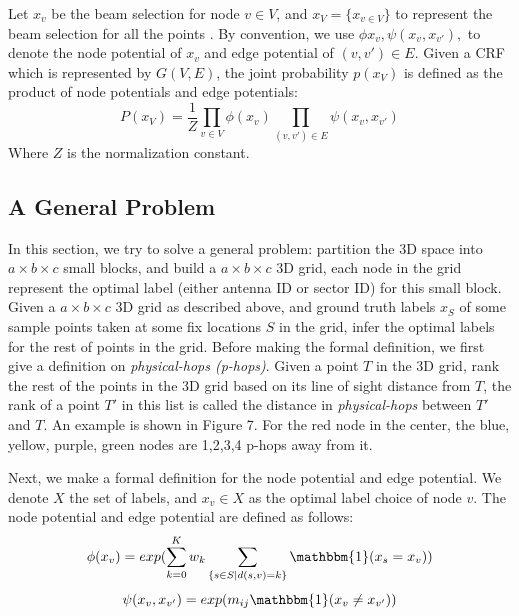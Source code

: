 \documentclass[conference]{IEEEtran}
\begin{document}
Let $x_{v}$ be the beam selection for node $v\in V$, and $x_{V}=\{x_{v\in V}\}$ to represent the beam selection for all the points . By convention, we use $\phi{x_{v}},\psi(x_{v},x_{v'}),$ to denote the node potential of $x_{v}$ and edge potential of $(v,v')\in E$. Given a CRF which is represented by $G(V,E)$, the joint probability $p(x_{V})$ is defined as the product of node potentials and edge potentials:
\begin{equation}
P(x_V)=\frac{1}{Z}\prod_{v\in V} \phi(x_{v})\prod_{(v,v')\in E} \psi(x_{v},x_{v'})
\end{equation} 
Where $Z$ is the normalization constant. 
\subsection{A General Problem}
In this section, we try to solve a general problem: partition the 3D space into $a\times b\times c$ small blocks, and build a $a\times b\times c$ 3D grid, each node in the grid represent the optimal label (either antenna ID or sector ID) for this small block. Given a $a\times b\times c$ 3D grid as described above, and ground truth labels $x_{S}$ of some sample points taken at some fix locations $S$ in the grid, infer the optimal labels for the rest of points in the grid.
Before making the formal definition, we first give a definition on \emph{physical-hops (p-hops)}. Given a point $T$ in the 3D grid, rank the rest of the points in the 3D grid based on its line of sight distance from $T$, the rank of a point $T'$ in this list is called the distance in \emph{physical-hops} between $T'$ and $T$. An example is shown in Figure 7. For the red node in the center, the blue, yellow, purple, green nodes are 1,2,3,4 p-hops away from it. 

Next, we make a formal definition for the node potential and edge potential. We denote $X$ the set of labels, and $x_{v} \in X$ as the optimal label choice of node $v$. The node potential and edge potential are defined as follows:
\begin{equation}
\phi(x_{v})=exp(\sum_{k=0}^{K} w_{k} \sum_{\{s\in S| d(s,v)=k\}} \mathbbm{1}(x_{s}=x_{v}))
\end{equation} 
\begin{equation}
\psi(x_{v},x_{v'})=exp(m_{ij}\mathbbm{1}(x_{v}\neq x_{v'}))
\end{equation} 
\end{document}
